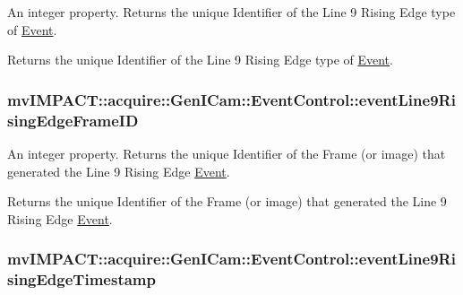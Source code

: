 An integer property. Returns the unique Identifier of the Line 9 Rising Edge type of \hyperlink{classmv_i_m_p_a_c_t_1_1acquire_1_1_event}{Event}. 

Returns the unique Identifier of the Line 9 Rising Edge type of \hyperlink{classmv_i_m_p_a_c_t_1_1acquire_1_1_event}{Event}. \hypertarget{classmv_i_m_p_a_c_t_1_1acquire_1_1_gen_i_cam_1_1_event_control_a58caac0e560404a6253550ae991c8292}{
\subsubsection[{event\+Line9\+Rising\+Edge\+Frame\+I\+D}]{ mv\+I\+M\+P\+A\+C\+T\+::acquire\+::\+Gen\+I\+Cam\+::\+Event\+Control\+::event\+Line9\+Rising\+Edge\+Frame\+I\+D}}\label{classmv_i_m_p_a_c_t_1_1acquire_1_1_gen_i_cam_1_1_event_control_a58caac0e560404a6253550ae991c8292}


An integer property. Returns the unique Identifier of the Frame (or image) that generated the Line 9 Rising Edge \hyperlink{classmv_i_m_p_a_c_t_1_1acquire_1_1_event}{Event}. 

Returns the unique Identifier of the Frame (or image) that generated the Line 9 Rising Edge \hyperlink{classmv_i_m_p_a_c_t_1_1acquire_1_1_event}{Event}. \hypertarget{classmv_i_m_p_a_c_t_1_1acquire_1_1_gen_i_cam_1_1_event_control_affce32c95f199264b835c8be5a8d1651}{
\subsubsection[{event\+Line9\+Rising\+Edge\+Timestamp}]{ mv\+I\+M\+P\+A\+C\+T\+::acquire\+::\+Gen\+I\+Cam\+::\+Event\+Control\+::event\+Line9\+Rising\+Edge\+Timestamp}}\label{classmv_i_m_p_a_c_t_1_1acquire_1_1_gen_i_cam_1_1_event_control_affce32c95f199264b835c8be5a8d1651}


